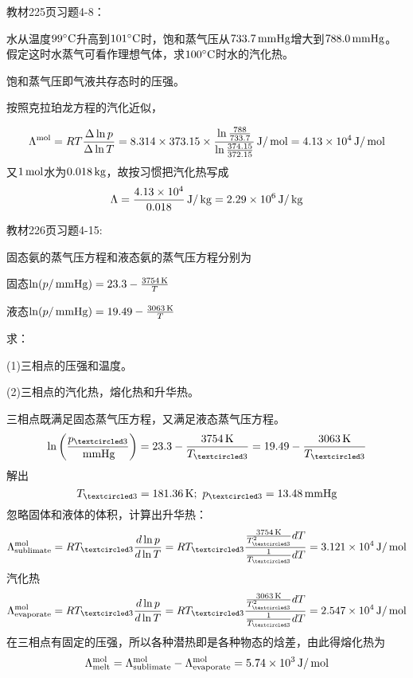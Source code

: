 \documentclass[CJK]{beamer}
\begin{document}
\begin{frame}
  \chtitle{\proid (\sone)}
  \bch
  教材225页习题4-8：

  水从温度$99^\circ \mathrm{C}$升高到$101^\circ \mathrm{C}$时，饱和蒸气压从$733.7\,\mathrm{mmHg}$增大到$788.0\,\mathrm{mmHg}$。假定这时水蒸气可看作理想气体，求$100^\circ \mathrm{C}$时水的汽化热。
  \ech
\end{frame}


\begin{frame}
  \bch
  {\small
  饱和蒸气压即气液共存态时的压强。
  
  按照克拉珀龙方程的汽化近似，
  
  $$\Lambda^{\rm mol} = RT \frac{\Delta \ln p}{\Delta \ln T} = 8.314\times 373.15 \times \frac{\ln\frac{788}{733.7}}{\ln\frac{374.15}{372.15}} \,\mathrm{J}/\,\mathrm{mol} = 4.13\times 10^4 \,\mathrm{J}/\,\mathrm{mol}$$
  又$1\,\mathrm{mol}$水为$0.018\,\mathrm{kg}$，故按习惯把汽化热写成
  $$ \Lambda = \frac{4.13\times 10^4}{0.018} \,\mathrm{J}/\,\mathrm{kg} = 2.29\times 10^6 \,\mathrm{J}/\,\mathrm{kg}$$
  }
  \ech
\end{frame}

\begin{frame}
  \chtitle{\proid (\stwo)}
  \bch
  教材226页习题4-15:

  固态氨的蒸气压方程和液态氨的蒸气压方程分别为
  
  固态$\ln(p/\,\mathrm{mmHg}) = 23.3 - \frac{3754\,\mathrm{K}}{T}$

  液态$\ln(p/\,\mathrm{mmHg}) = 19.49 -\frac{3063\,\mathrm{K}}{T}$

  求：

  (1)三相点的压强和温度。

  (2)三相点的汽化热，熔化热和升华热。
  \ech
\end{frame}


\begin{frame}
  \bch
      {\scriptsize
        三相点既满足固态蒸气压方程，又满足液态蒸气压方程。
        $$\ln\left(\frac{\pthree}{\SImmHg}\right) = 23.3-\frac{3754\SIK}{\Tthree} = 19.49 - \frac{3063 \SIK}{\Tthree}$$
        解出
        $$\Tthree = 181.36\SIK;\ \pthree = 13.48\SImmHg$$
        忽略固体和液体的体积，计算出升华热：
        $$\Lambda^{\rm mol}_{\rm sublimate} = R\Tthree \frac{d\ln p}{d\ln T} = R\Tthree \frac{ \frac{3754\SIK }{\Tthree^2} dT }{\frac{1}{\Tthree} dT} = 3.121\times 10^4 \SIJ/\SImol $$
        汽化热
        $$\Lambda^{\rm mol}_{\rm evaporate} = R\Tthree \frac{d\ln p}{d\ln T} = R\Tthree \frac{ \frac{3063\SIK }{\Tthree^2} dT }{\frac{1}{\Tthree} dT} = 2.547\times 10^4 \SIJ/\SImol $$
        在三相点有固定的压强，所以各种潜热即是各种物态的焓差，由此得熔化热为
        $$\Lambda^{\rm mol}_{\rm melt} = \Lambda^{\rm mol}_{\rm sublimate} - \Lambda^{\rm mol}_{\rm evaporate} = 5.74 \times 10^3 \,\mathrm{J}/\,\mathrm{mol}$$
        
      }
  \ech
\end{frame}
\end{document}
